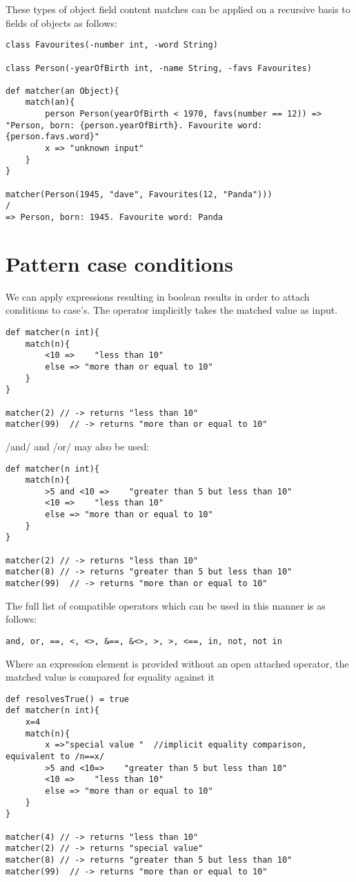 \documentclass[conc-doc]{subfiles}
\begin{document}
These types of object field content matches can be applied on a recursive basis to fields of objects as follows:
\begin{lstlisting}
class Favourites(-number int, -word String)

class Person(-yearOfBirth int, -name String, -favs Favourites)

def matcher(an Object){
	match(an){
		person Person(yearOfBirth < 1970, favs(number == 12)) => "Person, born: {person.yearOfBirth}. Favourite word: {person.favs.word}"
		x => "unknown input"
	}
}

matcher(Person(1945, "dave", Favourites(12, "Panda")))
/
=> Person, born: 1945. Favourite word: Panda
\end{lstlisting}

\section{Pattern case conditions}
We can apply expressions resulting in boolean results in order to attach conditions to case's. The operator implicitly takes the matched value as input.

\begin{lstlisting}
def matcher(n int){
	match(n){
		<10 =>    "less than 10" 
		else => "more than or equal to 10" 
	}
}

matcher(2) // -> returns "less than 10"
matcher(99)  // -> returns "more than or equal to 10"
\end{lstlisting}

/and/ and /or/ may also be used:

\begin{lstlisting}
def matcher(n int){
	match(n){
		>5 and <10 =>    "greater than 5 but less than 10" 
		<10 =>    "less than 10" 
		else => "more than or equal to 10" 
	}
}

matcher(2) // -> returns "less than 10"
matcher(8) // -> returns "greater than 5 but less than 10"
matcher(99)  // -> returns "more than or equal to 10"
\end{lstlisting}

The full list of compatible operators which can be used in this manner is as follows:

\lstinline{and, or, ==, <, <>, &==, &<>, >, >, <==, in, not, not in}

Where an expression element is provided without an open attached operator, the matched value is compared for equality against it

\begin{lstlisting}
def resolvesTrue() = true
def matcher(n int){
	x=4
	match(n){
		x =>"special value "  //implicit equality comparison, equivalent to /n==x/
		>5 and <10=>    "greater than 5 but less than 10" 
		<10 =>    "less than 10" 
		else => "more than or equal to 10" 
	}
}

matcher(4) // -> returns "less than 10"
matcher(2) // -> returns "special value"
matcher(8) // -> returns "greater than 5 but less than 10"
matcher(99)  // -> returns "more than or equal to 10"
\end{lstlisting}
\end{document}
